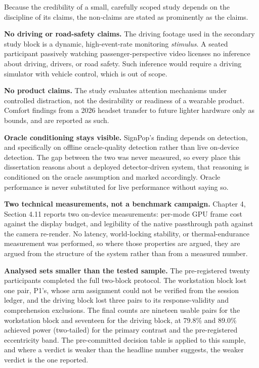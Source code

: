 Because the credibility of a small, carefully scoped study depends on the discipline of its claims,
the non-claims are stated as prominently as the claims.

\textbf{No driving or road-safety claims.} The driving footage used in the secondary study block is a
dynamic, high-event-rate monitoring \textit{stimulus}. A seated participant passively watching
passenger-perspective video licenses no inference about driving, drivers, or road safety. Such
inference would require a driving simulator with vehicle control, which is out of scope.

\textbf{No product claims.} The study evaluates attention mechanisms under controlled distraction,
not the desirability or readiness of a wearable product. Comfort findings from a 2026 headset
transfer to future lighter hardware only as bounds, and are reported as such.

\textbf{Oracle conditioning stays visible.} SignPop's finding depends on detection, and specifically
on offline oracle-quality detection rather than live on-device detection. The gap between the two was
never measured, so every place this dissertation reasons about a deployed detector-driven system,
that reasoning is conditioned on the oracle assumption and marked accordingly. Oracle performance is
never substituted for live performance without saying so.

\textbf{Two technical measurements, not a benchmark campaign.} Chapter 4, Section 4.11 reports two
on-device measurements: per-mode GPU frame cost against the display budget, and legibility of the
native passthrough path against the camera re-render. No latency, world-locking stability, or
thermal-endurance measurement was performed, so where those properties are argued, they are argued
from the structure of the system rather than from a measured number.

\textbf{Analysed sets smaller than the tested sample.} The pre-registered twenty
participants completed the full two-block protocol. The workstation block
lost one pair, P1's, whose arm assignment could not be verified from the session ledger, and the
driving block lost three pairs to its response-validity and comprehension exclusions. The
final counts are nineteen usable pairs for the workstation block and seventeen for the driving block,
at 79.8\% and 89.0\% achieved power (two-tailed) for the primary contrast and the pre-registered
eccentricity band.
The pre-committed decision table is applied to this sample, and where a verdict is weaker than the
headline number suggests, the weaker verdict is the one reported.

